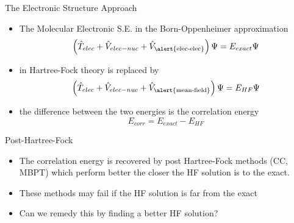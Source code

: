 \documentclass[10pt]{beamer}
\begin{document}
\begin{frame}{The Electronic Structure Approach}
	\begin{itemize}[<+->]
		\item {The Molecular Electronic S.E. in the Born-Oppenheimer approximation
		  \begin{equation*}
  		  \left( 
        \hat{T}_{elec} + \hat{V}_{elec-nuc} 
                       + \hat{V}_{\textrm{\alert{elec-elec}}} 
  		 \right)
  		 \Psi
  		  = E_{exact}\Psi
		  \end{equation*}
		}
		\item {in Hartree-Fock theory is replaced by
		  \begin{equation*}
  		  \left( 
        \hat{T}_{elec} + \hat{V}_{elec-nuc} + 
  		   \hat{V}_{\textrm{\alert{mean-field}}} 
  		 \right)
  		 \Psi
  		  = E_{HF}\Psi
		  \end{equation*}
		}
		\item {the difference between the two energies is the \alert{correlation energy}
		  \begin{equation*}
		    E_{corr} = E_{exact} - E_{HF}
		  \end{equation*}
    }

	\end{itemize}
\end{frame}

\begin{frame}{Post-Hartree-Fock}
  \begin{itemize}
    \item {The correlation energy is recovered by post Hartree-Fock methods (CC, MBPT)
    which perform better the closer the HF solution is to the exact.} 
    \item {These methods may fail if the HF solution is far from the exact}
    \item {Can we remedy this by finding a better HF solution?}
  \end{itemize}
\end{frame}
\end{document}
